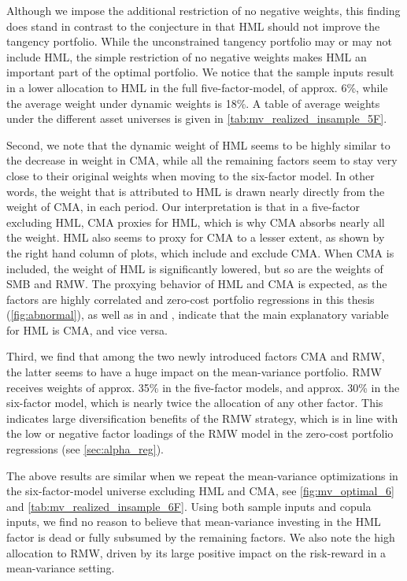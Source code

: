 Although we impose the additional restriction of no negative weights, this finding does stand in contrast to the conjecture in \textcite{FF2015} that HML should not improve the tangency portfolio. While the unconstrained tangency portfolio may or may not include HML, the simple restriction of no negative weights makes HML an important part of the optimal portfolio. We notice that the sample inputs result in a lower allocation to HML in the full five-factor-model, of approx. 6\%, while the average weight under dynamic weights is 18\%. A table of average weights under the different asset universes is given in \autoref{tab:mv_realized_insample_5F}.

Second, we note that the dynamic weight of HML seems to be highly similar to the decrease in weight in CMA, while all the remaining factors seem to stay very close to their original weights when moving to the six-factor model. In other words, the weight that is attributed to HML is drawn nearly directly from the weight of CMA, in each period. Our interpretation is that in a five-factor excluding HML, CMA proxies for HML, which is why CMA absorbs nearly all the weight. HML also seems to proxy for CMA to a lesser extent, as shown by the right hand column of plots, which include and exclude CMA. When CMA is included, the weight of HML is significantly lowered, but so are the weights of SMB and RMW. The proxying behavior of HML and CMA is expected, as the factors are highly correlated and zero-cost portfolio regressions in this thesis (\autoref{fig:abnormal}), as well as in \textcite{FF2015} and \textcite{Asness2015}, indicate that the main explanatory variable for HML is CMA, and vice versa.

Third, we find that among the two newly introduced factors CMA and RMW, the latter seems to have a huge impact on the mean-variance portfolio. RMW receives weights of approx. 35\% in the five-factor models, and approx. 30\% in the six-factor model, which is nearly twice the allocation of any other factor. This indicates large diversification benefits of the RMW strategy, which is in line with the low or negative factor loadings of the RMW model in the zero-cost portfolio regressions (see \autoref{sec:alpha_reg}).

The above results are similar when we repeat the mean-variance optimizations in the six-factor-model universe excluding HML and CMA, see \autoref{fig:mv_optimal_6} and \autoref{tab:mv_realized_insample_6F}. Using both sample inputs and copula inputs, we find no reason to believe that mean-variance investing in the HML factor is dead or fully subsumed by the remaining factors. We also note the high allocation to RMW, driven by its large positive impact on the risk-reward in a mean-variance setting. 


